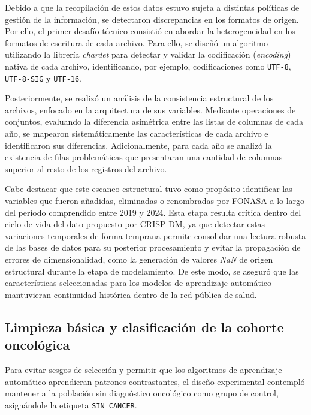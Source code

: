 
Debido a que la recopilación de estos datos estuvo sujeta a distintas políticas de gestión de la información, se detectaron discrepancias en los formatos de origen. Por ello, el primer desafío técnico consistió en abordar la heterogeneidad en los formatos de escritura de cada archivo. Para ello, se diseñó un algoritmo utilizando la librería \textit{chardet} para detectar y validar la codificación (\textit{encoding}) nativa de cada archivo, identificando, por ejemplo, codificaciones como \texttt{UTF-8}, \texttt{UTF-8-SIG} y \texttt{UTF-16}.

Posteriormente, se realizó un análisis de la consistencia estructural de los archivos, enfocado en la arquitectura de sus variables. Mediante operaciones de conjuntos, evaluando la diferencia asimétrica entre las listas de columnas de cada año, se mapearon sistemáticamente las características de cada archivo e identificaron sus diferencias. Adicionalmente, para cada año se analizó la existencia de filas problemáticas que presentaran una cantidad de columnas superior al resto de los registros del archivo.

Cabe destacar que este escaneo estructural tuvo como propósito identificar las variables que fueron añadidas, eliminadas o renombradas por FONASA a lo largo del período comprendido entre 2019 y 2024. Esta etapa resulta crítica dentro del ciclo de vida del dato propuesto por CRISP-DM, ya que detectar estas variaciones temporales de forma temprana permite consolidar una lectura robusta de las bases de datos para su posterior procesamiento y evitar la propagación de errores de dimensionalidad, como la generación de valores \textit{NaN} de origen estructural durante la etapa de modelamiento. De este modo, se aseguró que las características seleccionadas para los modelos de aprendizaje automático mantuvieran continuidad histórica dentro de la red pública de salud.




\subsection{Limpieza básica y clasificación de la cohorte oncológica}

Para evitar sesgos de selección y permitir que los algoritmos de aprendizaje automático aprendieran patrones contrastantes, el diseño experimental contempló mantener a la población sin diagnóstico oncológico como grupo de control, asignándole la etiqueta \texttt{SIN\_CANCER}.

